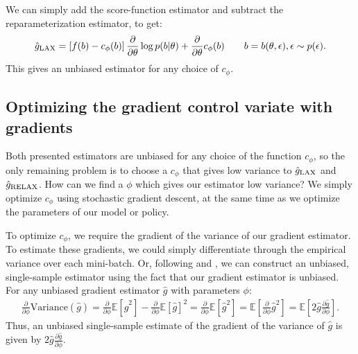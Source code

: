 \documentclass{article}
\newcommand{\E}{\mathbb{E}}
\newcommand{\PT}{\frac{\partial}{\partial \theta}}
\newcommand{\PPH}{\frac{\partial}{\partial \phi}}
\newcommand{\LP}[1]{\PT \log p(#1)}
\newcommand{\LAX}{{\textnormal{LAX}}}
\newcommand{\RELAX}{{\textnormal{RELAX}}}
\begin{document}
%
%
%
We can simply add the score-function estimator and subtract the reparameterization estimator, to get:
%
\begin{align}
\label{eq:cont_est}
\hat g_\LAX = \left[ f(b) -c_\phi(b) \right] \PT \log p(b|\theta) + \PT c_\phi(b) \qquad b = b(\theta, \epsilon), \epsilon \sim p(\epsilon).
\end{align}
%
This gives an unbiased estimator for any choice of $c_\phi$.

\subsection{Optimizing the gradient control variate with gradients}

Both presented estimators are unbiased for any choice of the function $c_\phi$, so the only remaining problem is to choose a $c_\phi$ that gives low variance to $\hat g_\LAX$ and $\hat g_\RELAX{}$.
How can we find a $\phi$ which gives our estimator low variance?
We simply optimize $c_\phi$ using stochastic gradient descent, at the same time as we optimize the parameters of our model or policy.

To optimize $c_\phi$, we require the gradient of the variance of our gradient estimator.
To estimate these gradients, we could simply differentiate through the empirical variance over each mini-batch.
Or, following \cite{tucker2017rebar} and \cite{ruiz2016overdispersed}, we can construct an unbiased, single-sample estimator using the fact that our gradient estimator is unbiased.
For any unbiased gradient estimator $\hat g$ with parameters $\phi$:
%
\begin{align}
\PPH \text{Variance}(\hat g)
= \PPH \E[\hat g^2] - \PPH \E[\hat g]^2
= \PPH \E[\hat g^2]
= \E \left[ \PPH \hat g^2 \right]
= \E \left[ 2 \hat g \frac{\partial \hat g}{\partial \phi} \right].
\label{eq:vargrad}
\end{align}  %
%
Thus, an unbiased single-sample estimate of the gradient of the variance of $\hat g$ is given by {$2 \hat g \frac{\partial \hat g}{\partial \phi}$}.
\end{document}
